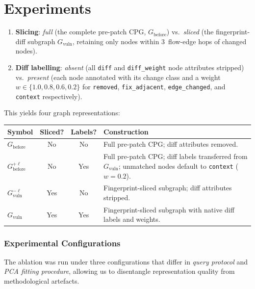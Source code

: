 \documentclass[11pt, a4paper]{article}
\begin{document}
\section{Experiments}
  \begin{enumerate}[nosep]
    \item \textbf{Slicing}: \emph{full} (the complete pre-patch CPG,
      $G_{\mathrm{before}}$) vs.\ \emph{sliced} (the
      fingerprint-diff subgraph $G_{\mathrm{vuln}}$, retaining only
      nodes within 3~flow-edge hops of changed nodes).
    \item \textbf{Diff labelling}: \emph{absent} (all \texttt{diff}
      and \texttt{diff\_weight} node attributes stripped) vs.\
      \emph{present} (each node annotated with its change class and
      a weight $w \in \{1.0, 0.8, 0.6, 0.2\}$ for \texttt{removed},
      \texttt{fix\_adjacent}, \texttt{edge\_changed}, and
      \texttt{context} respectively).
  \end{enumerate}

  This yields four graph representations:

  \begin{center}
  \small
  \renewcommand{\arraystretch}{1.3}
  \begin{tabular}{lccl}
    \toprule
    \textbf{Symbol} & \textbf{Sliced?} & \textbf{Labels?}
      & \textbf{Construction} \\
    \midrule
    $G_{\mathrm{before}}$
      & No & No
      & Full pre-patch CPG; diff attributes removed. \\
    $G_{\mathrm{before}}^{+\ell}$
      & No & Yes
      & Full pre-patch CPG; diff labels transferred from
        $G_{\mathrm{vuln}}$; unmatched nodes default to
        \texttt{context} ($w{=}0.2$). \\
    $G_{\mathrm{vuln}}^{-\ell}$
      & Yes & No
      & Fingerprint-sliced subgraph; diff attributes stripped. \\
    $G_{\mathrm{vuln}}$
      & Yes & Yes
      & Fingerprint-sliced subgraph with native diff labels
        and weights. \\
    \bottomrule
  \end{tabular}
  \end{center}

  \subsubsection{Experimental Configurations}

  The ablation was run under three configurations that differ in
  \emph{query protocol} and \emph{PCA fitting procedure}, allowing
  us to disentangle representation quality from methodological
  artefacts.
\end{document}
